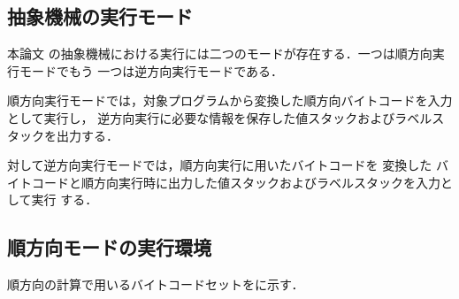 \documentclass[submit,PRO]{ipsj}
\begin{document}
\subsection{抽象機械の実行モード}
本論文%
の抽象機械における実行には二つのモードが存在する．一つは順方向実行モードでもう
一つは逆方向実行モードである．

順方向実行モードでは，対象プログラムから変換した順方向バイトコードを入力として実行し，
逆方向実行に必要な情報を保存した値スタックおよびラベルスタックを出力する．

対して逆方向実行モードでは，順方向実行に用いたバイトコードを%
変換した%
バイトコードと順方向実行時に出力した値スタックおよびラベルスタックを入力として実行%
する．


\subsection{順方向モードの実行環境}

順方向の計算で用いるバイトコードセットをに示す．
\end{document}
